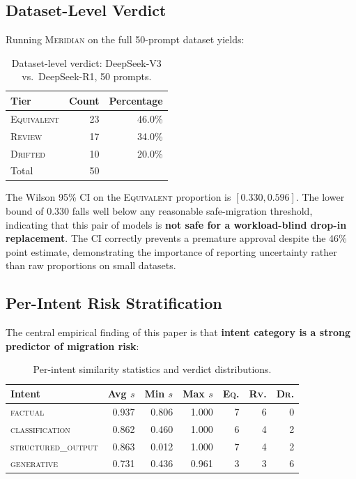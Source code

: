 \documentclass[11pt,a4paper]{article}
\begin{document}
\subsection{Dataset-Level Verdict}

Running \textsc{Meridian} on the full 50-prompt dataset yields:

\begin{table}[h]
\centering
\begin{tabular}{lrr}
\toprule
Tier & Count & Percentage \\
\midrule
\textcolor{eqgreen}{\textsc{Equivalent}} & 23 & 46.0\% \\
\textcolor{rvyellow}{\textsc{Review}}    & 17 & 34.0\% \\
\textcolor{drred}{\textsc{Drifted}}      & 10 & 20.0\% \\
\midrule
Total & 50 & \\
\bottomrule
\end{tabular}
\caption{Dataset-level verdict: DeepSeek-V3 vs.\ DeepSeek-R1, 50 prompts.}
\label{tab:overall}
\end{table}

The Wilson 95\% CI on the \textsc{Equivalent} proportion is $[0.330, 0.596]$.
The lower bound of 0.330 falls well below any reasonable safe-migration threshold,
indicating that this pair of models is \textbf{not safe for a workload-blind
drop-in replacement}.
The CI correctly prevents a premature approval despite the 46\% point estimate,
demonstrating the importance of reporting uncertainty rather than raw proportions
on small datasets.

\subsection{Per-Intent Risk Stratification}

The central empirical finding of this paper is that \textbf{intent category is a
strong predictor of migration risk}:

\begin{table}[h]
\centering
\begin{tabular}{lrrrrrr}
\toprule
Intent & Avg $s$ & Min $s$ & Max $s$ & \textsc{Eq.} & \textsc{Rv.} & \textsc{Dr.} \\
\midrule
\textsc{factual}           & 0.937 & 0.806 & 1.000 & 7 & 6 & 0 \\
\textsc{classification}    & 0.862 & 0.460 & 1.000 & 6 & 4 & 2 \\
\textsc{structured\_output}& 0.863 & 0.012 & 1.000 & 7 & 4 & 2 \\
\textsc{generative}        & 0.731 & 0.436 & 0.961 & 3 & 3 & 6 \\
\bottomrule
\end{tabular}
\caption{Per-intent similarity statistics and verdict distributions.}
\label{tab:by_intent}
\end{table}
\end{document}
